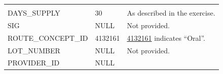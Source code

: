 \documentclass[11pt]{book}
\theoremstyle{definition}
\theoremstyle{definition}
\theoremstyle{definition}
\theoremstyle{remark}
\begin{document}
\begin{longtable}[]{@{}lll@{}}
\begin{minipage}[t]{0.48\columnwidth}
\end{minipage}\tabularnewline
\begin{minipage}[t]{0.28\columnwidth}\raggedright\strut
DAYS\_SUPPLY\strut
\end{minipage} & \begin{minipage}[t]{0.16\columnwidth}\raggedright\strut
30\strut
\end{minipage} & \begin{minipage}[t]{0.48\columnwidth}\raggedright\strut
As described in the exercise.\strut
\end{minipage}\tabularnewline
\begin{minipage}[t]{0.28\columnwidth}\raggedright\strut
SIG\strut
\end{minipage} & \begin{minipage}[t]{0.16\columnwidth}\raggedright\strut
NULL\strut
\end{minipage} & \begin{minipage}[t]{0.48\columnwidth}\raggedright\strut
Not provided.\strut
\end{minipage}\tabularnewline
\begin{minipage}[t]{0.28\columnwidth}\raggedright\strut
ROUTE\_CONCEPT\_ID\strut
\end{minipage} & \begin{minipage}[t]{0.16\columnwidth}\raggedright\strut
4132161\strut
\end{minipage} & \begin{minipage}[t]{0.48\columnwidth}\raggedright\strut
\href{http://athena.ohdsi.org/search-terms/terms/4132161}{4132161}
indicates ``Oral''.\strut
\end{minipage}\tabularnewline
\begin{minipage}[t]{0.28\columnwidth}\raggedright\strut
LOT\_NUMBER\strut
\end{minipage} & \begin{minipage}[t]{0.16\columnwidth}\raggedright\strut
NULL\strut
\end{minipage} & \begin{minipage}[t]{0.48\columnwidth}\raggedright\strut
Not provided.\strut
\end{minipage}\tabularnewline
\begin{minipage}[t]{0.28\columnwidth}\raggedright\strut
PROVIDER\_ID\strut
\end{minipage} & \begin{minipage}[t]{0.16\columnwidth}\raggedright\strut
NULL\strut
\end{minipage} & \begin{minipage}[t]{0.48\columnwidth}\raggedright\strut

\end{minipage}
\end{longtable}
\end{document}

